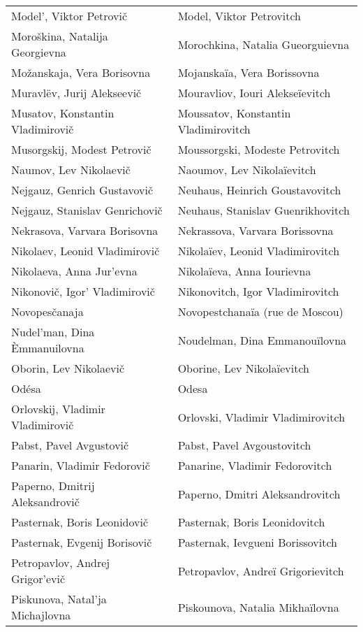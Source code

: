 {\begin{longtable}[c]{ll}
 \\
 Model', Viktor Petrovič
 & Model, Viktor Petrovitch
 \\
 Moroškina, Natalija Georgievna
 & Morochkina, Natalia Gueorguievna
 \\
 Možanskaja, Vera Borisovna
 & Mojanskaïa, Vera Borissovna
 \\
 Muravlëv, Jurij Alekseevič
 & Mouravliov, Iouri Alekseïevitch
 \\
 Musatov, Konstantin Vladimirovič
 & Moussatov, Konstantin Vladimirovitch
 \\
 Musorgskij, Modest Petrovič
 & Moussorgski, Modeste Petrovitch
 \\
 Naumov, Lev Nikolaevič
 & Naoumov, Lev Nikolaïevitch
 \\
 Nejgauz, Genrich Gustavovič
 & Neuhaus, Heinrich Goustavovitch
 \\
 Nejgauz, Stanislav Genrichovič
 & Neuhaus, Stanislav Guenrikhovitch
 \\
 Nekrasova, Varvara Borisovna
 & Nekrassova, Varvara Borissovna
 \\
 Nikolaev, Leonid Vladimirovič
 & Nikolaïev, Leonid Vladimirovitch
 \\
 Nikolaeva, Anna Jur'evna
 & Nikolaïeva, Anna Iourievna
 \\
 Nikonovič, Igor' Vladimirovič
 & Nikonovitch, Igor Vladimirovitch
 \\
 Novopesčanaja
 & Novopestchanaïa (rue de Moscou)
 \\
 Nudel'man, Dina Èmmanuilovna
 & Noudelman, Dina Emmanouïlovna
 \\
 Oborin, Lev Nikolaevič
 & Oborine, Lev Nikolaïevitch
 \\
 Odésa
 & Odesa
 \\
 Orlovskij, Vladimir Vladimirovič
 & Orlovski, Vladimir Vladimirovitch
 \\
 Pabst, Pavel Avgustovič
 & Pabst, Pavel Avgoustovitch
 \\
 Panarin, Vladimir Fedorovič
 & Panarine, Vladimir Fedorovitch
 \\
 Paperno, Dmitrij Aleksandrovič
 & Paperno, Dmitri Aleksandrovitch
 \\
 Pasternak, Boris Leonidovič
 & Pasternak, Boris Leonidovitch
 \\
 Pasternak, Evgenij Borisovič
 & Pasternak, Ievgueni Borissovitch
 \\
 Petropavlov, Andrej Grigor'evič
 & Petropavlov, Andreï Grigorievitch
 \\
 Piskunova, Natal'ja Michajlovna
 & Piskounova, Natalia Mikhaïlovna

\end{longtable}}
